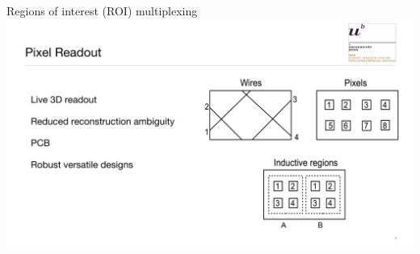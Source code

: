 \documentclass[]{beamer}
\begin{document}
\begin{frame}{Regions of interest (ROI) multiplexing}
	\centering
	\includegraphics[page=2, viewport=20 0 1770 845, clip, width=\textwidth]{defence/Pixels}
\end{frame}
\end{document}

